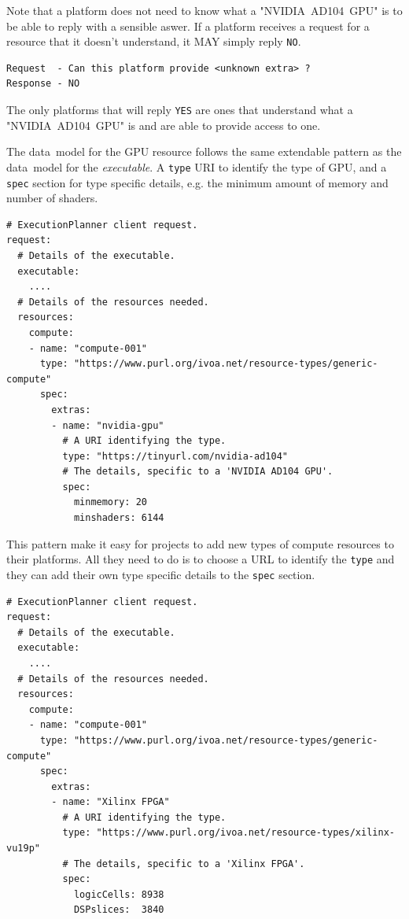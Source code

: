 \documentclass[11pt,a4paper]{ivoa}
\newcommand{\datamodel} {data~model}
\newcommand{\codeword}[1] {\texttt{#1}}
\newcommand{\executable} {\textit{executable}}
\newcommand{\gpu} {GPU}
\newcommand{\nvidiagpu} {NVIDIA~AD104~GPU}
\begin{document}
Note that a platform does not need to know what a  "\nvidiagpu{}" is to be able to reply with a sensible aswer.
If a platform receives a request for a resource that it doesn't understand, it MAY simply reply \codeword{NO}.

\begin{lstlisting}[]
Request  - Can this platform provide <unknown extra> ?
Response - NO
\end{lstlisting}

The only platforms that will reply \codeword{YES} are ones that understand what a "\nvidiagpu{}"
is and are able to provide access to one.

The \datamodel{} for the \gpu{} resource follows the same extendable pattern as the \datamodel{} for
the \executable{}. A \codeword{type} URI to identify the type of \gpu{},
and a \codeword{spec} section for type specific details,
e.g. the minimum amount of memory and number of shaders.

\begin{lstlisting}[]
# ExecutionPlanner client request.
request:
  # Details of the executable.
  executable:
    ....
  # Details of the resources needed.
  resources:
    compute:
    - name: "compute-001"
      type: "https://www.purl.org/ivoa.net/resource-types/generic-compute"
      spec:
        extras:
        - name: "nvidia-gpu"
          # A URI identifying the type.
          type: "https://tinyurl.com/nvidia-ad104"
          # The details, specific to a 'NVIDIA AD104 GPU'.
          spec:
            minmemory: 20
            minshaders: 6144
\end{lstlisting}

This pattern make it easy for projects to add new types of compute resources to their
platforms. All they need to do is to choose a URL to identify the \codeword{type}
and they can add their own type specific details to the \codeword{spec} section.

\begin{lstlisting}[]
# ExecutionPlanner client request.
request:
  # Details of the executable.
  executable:
    ....
  # Details of the resources needed.
  resources:
    compute:
    - name: "compute-001"
      type: "https://www.purl.org/ivoa.net/resource-types/generic-compute"
      spec:
        extras:
        - name: "Xilinx FPGA"
          # A URI identifying the type.
          type: "https://www.purl.org/ivoa.net/resource-types/xilinx-vu19p"
          # The details, specific to a 'Xilinx FPGA'.
          spec:
            logicCells: 8938
            DSPslices:  3840
\end{lstlisting}
\end{document}
